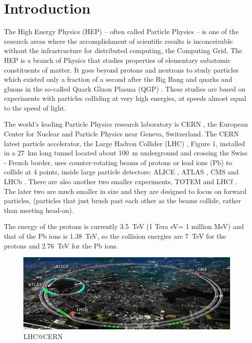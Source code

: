 



\maketitle

\section{Introduction}

The High Energy Physics (HEP) \citep{HEP} -- often called Particle
Physics -- is one of the research areas where the accomplishment of
scientific results is  inconceivable without the infrastructure for
distributed computing, the Computing Grid. The HEP is a branch of
Physics that studies properties of elementary subatomic constituents
of matter. It goes beyond protons and neutrons to study particles
which existed only a fraction of a second after the Big Bang and
quarks and gluons in the so-called Quark Gluon Plasma (QGP) \cite{QGP}.
These studies are based on experiments with particles colliding at
very high energies, at speeds almost equal to the speed of light.

The world's leading Particle Physics research laboratory is CERN
\cite{CERN}, the European Center for Nuclear and Particle Physics near
Geneva, Switzerland. The CERN latest particle accelerator, the Large
Hadron Collider (LHC) \cite{LHC}, Figure 1, installed in a 27~km
long tunnel located about 100~m underground and crossing the Swiss -
French border, uses counter-rotating beams of protons or lead ions (Pb)
to collide at 4 points, inside large particle detectors: ALICE
\cite{ALICE}, ATLAS \cite{ATLAS}, CMS \cite{CMS} and LHCb \cite{LHCb}. There are also another two smaller
 experiments,  TOTEM \cite{TOTEM} and LHCf \cite{LHCf}. The later two are much smaller in size and they are designed
 to focus on forward particles, (particles that just brush past each other 
as the beams collide, rather than meeting head-on).

The energy of the protons is
currently 3.5~TeV (1 Tera eV= 1 million MeV) and that of the Pb ions is
1.38~TeV, so the collision energies are 7~TeV for the protons and
2.76~TeV for the Pb ions.

\begin{figure}[htb] %
\centering
\includegraphics[width=13cm]{fig01.eps} %
\caption{LHC@CERN}\label{fig01}
\end{figure}



